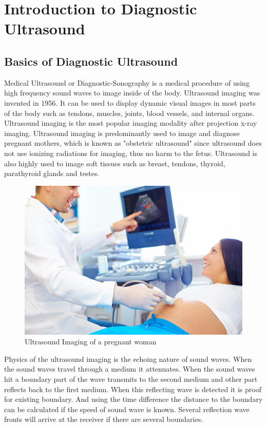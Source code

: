 \documentclass[12pt]{article}
\def \topic{Diagnostic Ultrasound}
\begin{document}

\tableofcontents
\pagebreak


\section{Introduction to \topic}
\subsection{Basics of \topic}
Medical Ultrasound or Diagnostic-Sonography is a medical procedure of using high frequency sound waves to image inside of the body. Ultrasound imaging was invented in 1956. It can be used to display dynamic visual images in most parts of the body such as  tendons, muscles, joints, blood vessels, and internal organs. Ultrasound imaging is the most popular imaging modality after projection x-ray imaging. Ultrasound imaging is predominantly used to image and diagnose pregnant mothers, which is known as "obstetric ultrasound" since ultrasound does not use ionizing radiations for imaging, thus no harm to the fetus. Ultrasound is also highly used to image soft tissues such as breast, tendons, thyroid, parathyroid glands and testes.

\begin{figure}[h!]
  \centering
  \includegraphics[width=0.8\linewidth]{U2.jpg}
  \caption{\small{Ultrasound Imaging of a pregnant woman}}
  \label{fig:Ultrasound Imaging}
\end{figure}

Physics of the ultrasound imaging is the echoing nature of sound waves. When the sound waves travel through a medium it attenuates. When the sound waves hit a boundary part of the wave transmits to the second medium and other part reflects back to the first medium. When this reflecting wave is detected it is proof for existing boundary. And using the time difference the distance to the boundary can be calculated if the speed of sound wave is known. Several reflection wave fronts will arrive at the receiver if there are several boundaries. 
\end{document}
